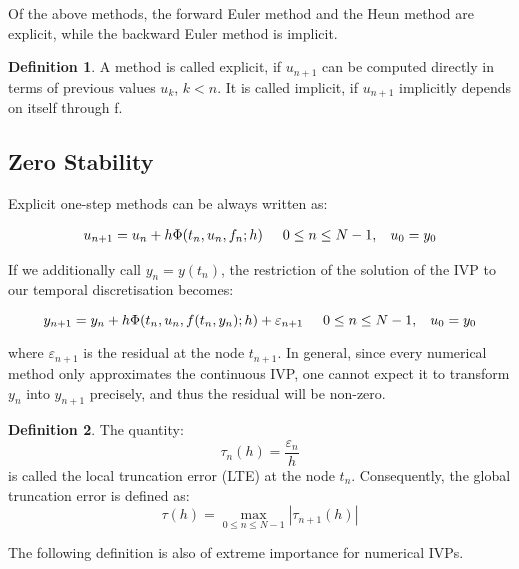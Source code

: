 \documentclass[11pt]{article}
\theoremstyle{theorem}
\theoremstyle{definition}
\newtheorem{definition}{Definition}
\begin{document}
Of the above methods, the forward Euler method and the Heun method are explicit,
while the backward Euler method is implicit.

\begin{definition}
	\label{def:implicit-explicit}
	A method is called explicit, if $u_{n+1}$ can be computed directly in terms of previous values $u_k$, $k<n$. It is called implicit, if $u_{n+1}$ implicitly depends on itself through f.
\end{definition}

\subsection{Zero Stability}
Explicit one-step methods can be always written as:

\begin{align}
	\label{eqn:one-step-method}
	u_{n+1}=u_n+h\Phi(t_n,u_n,f_n;h)\hspace{5mm}0\le n\le N-1,\hspace{3mm}u_0=y_0
\end{align}

If we additionally call $y_n=y(t_n)$, the restriction of the solution of the IVP to our
temporal discretisation becomes:

$$y_{n+1}=y_n+h\Phi(t_n,u_n,f(t_n, y_n);h)+\varepsilon_{n+1}\hspace{5mm}0\le n\le N-1,\hspace{3mm}u_0=y_0$$

where $\varepsilon_{n+1}$ is the residual at the node $t_{n+1}$. In general, since every numerical method only approximates the continuous IVP, one cannot expect it to transform $y_n$ into $y_{n+1}$ precisely, and thus the residual will be non-zero.\\

\begin{definition}
	\label{def:truncation-error}
	The quantity:
	\begin{equation}
		\label{eqn:local-truncation-error}
		\tau_n(h)=\frac{\varepsilon_n}{h}
	\end{equation}
	is called the local truncation error (LTE) at the node $t_n$. Consequently, the global truncation error is defined as:
	\begin{equation}
	\label{eqn:global-truncation-error}
	\tau(h)=\max\limits_{0\le n\le N-1}|\tau_{n+1}(h)|
	\end{equation}
\end{definition}

The following definition is also of extreme importance for numerical IVPs.
\end{document}
